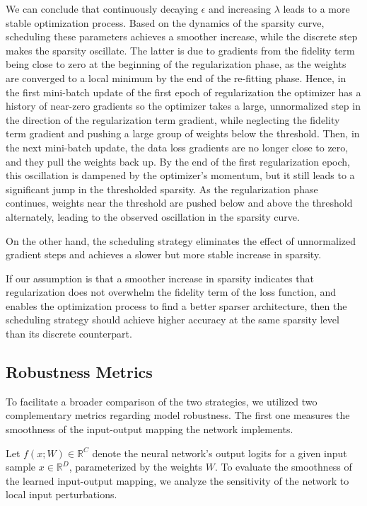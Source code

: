 We can conclude that continuously decaying $\epsilon$ and increasing $\lambda$ leads to a more stable optimization process. Based on 
the dynamics of the sparsity curve, scheduling these parameters achieves a smoother increase, while the discrete step 
makes the sparsity oscillate. The latter is due to gradients from the fidelity term being close to zero at the beginning of the regularization phase, 
as the weights are converged to a local minimum by the end of the re-fitting phase. Hence, in the first mini-batch update of the first epoch of
regularization the optimizer has a history of near-zero gradients so the optimizer
takes a large, unnormalized step in the direction of the regularization term gradient, while neglecting the fidelity term gradient and pushing
a large group of weights below the threshold. Then, in the next mini-batch update, the data loss gradients are no longer close to zero, 
and they pull the weights back up. By the end of the first regularization epoch, this oscillation is dampened by the optimizer's momentum, 
but it still leads to a significant jump in the thresholded sparsity. As the regularization phase continues, weights near the threshold are pushed 
below and above the threshold alternately, leading to the observed oscillation in the sparsity curve.

On the other hand, the scheduling strategy eliminates the effect of unnormalized gradient steps and achieves a slower but more
stable increase in sparsity.

If our assumption is that a smoother increase in sparsity indicates that regularization does not overwhelm the fidelity term of the loss function, and enables
the optimization process to find a better sparser architecture, then the scheduling strategy should achieve higher accuracy at the same sparsity level
than its discrete counterpart.

\subsection{Robustness Metrics}
To facilitate a broader comparison of the two strategies, we utilized two complementary metrics regarding model robustness. The first one
measures the smoothness of the input-output mapping the network implements.

Let $f(x; W) \in \mathbb{R}^C$ denote the neural network's output logits for a given input sample $x \in \mathbb{R}^D$, parameterized by the weights $W$. To evaluate the smoothness of the learned input-output mapping, we analyze the sensitivity of the network to local input perturbations.

